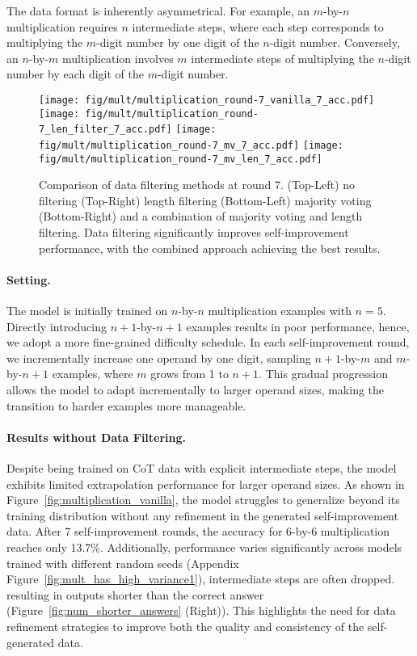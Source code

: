 The data format is inherently asymmetrical. For example, an $m$-by-$n$ multiplication requires $n$ intermediate steps, where each step corresponds to multiplying the $m$-digit number by one digit of the $n$-digit number. Conversely, an $n$-by-$m$ multiplication involves $m$ intermediate steps of multiplying the $n$-digit number by each digit of the $m$-digit number. 


\begin{wrapfigure}{r}{0.51\textwidth}
    \vspace{-8mm}
    \centering
    \texttt{[image: fig/mult/multiplication\_round-7\_vanilla\_7\_acc.pdf]}
    \texttt{[image: fig/mult/multiplication\_round-7\_len\_filter\_7\_acc.pdf]}
    \texttt{[image: fig/mult/multiplication\_round-7\_mv\_7\_acc.pdf]}
    \texttt{[image: fig/mult/multiplication\_round-7\_mv\_len\_7\_acc.pdf]}    
    \caption{Comparison of data filtering methods at round 7. (Top-Left) no filtering (Top-Right) length filtering (Bottom-Left) majority voting (Bottom-Right) and a combination of majority voting and length filtering. Data filtering significantly improves self-improvement performance, with the combined approach achieving the best results.}
    \vspace{-12mm}
    \label{fig:multiplication_filtering_comparison}
\end{wrapfigure}


\paragraph{Setting. }
The model is initially trained on $n$-by-$n$ multiplication examples with $n=5$. Directly introducing $n+1$-by-$n+1$ examples results in poor performance, hence, we adopt a more fine-grained difficulty schedule. In each self-improvement round, we incrementally increase one operand by one digit, sampling $n+1$-by-$m$ and $m$-by-$n+1$ examples, where $m$ grows from 1 to $n+1$. This gradual progression allows the model to adapt incrementally to larger operand sizes, making the transition to harder examples more manageable.


\paragraph{Results without Data Filtering. }
Despite being trained on CoT data with explicit intermediate steps, the model exhibits limited extrapolation performance for larger operand sizes. As shown in Figure~\ref{fig:multiplication_vanilla}, the model struggles to generalize beyond its training distribution without any refinement in the generated self-improvement data. After 7 self-improvement rounds, the accuracy for $6$-by-$6$ multiplication reaches only 13.7\%.
Additionally, performance varies significantly across models trained with different random seeds (Appendix Figure~\ref{fig:mult_has_high_variance1}), intermediate steps are often dropped. resulting in outputs shorter than the correct answer (Figure~\ref{fig:num_shorter_answers} (Right)). This highlights the need for data refinement strategies to improve both the quality and consistency of the self-generated data.




